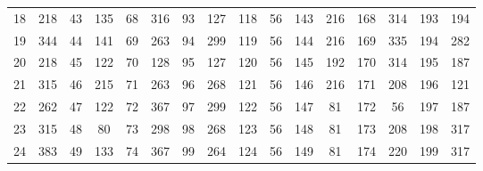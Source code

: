\begin{tabular}{|c|c|c|c|c|c|c|c|c|c|c|c|c|c|c|c|}
    18 & 218 & 43 & 135 & 68 & 316 & 93 & 127 & 118 & 56 & 143 & 216 & 168 & 314 & 193 & 194\\
    19 & 344 & 44 & 141 & 69 & 263 & 94 & 299 & 119 & 56 & 144 & 216 & 169 & 335 & 194 & 282\\
    20 & 218 & 45 & 122 & 70 & 128 & 95 & 127 & 120 & 56 & 145 & 192 & 170 & 314 & 195 & 187\\
    21 & 315 & 46 & 215 & 71 & 263 & 96 & 268 & 121 & 56 & 146 & 216 & 171 & 208 & 196 & 121\\
    22 & 262 & 47 & 122 & 72 & 367 & 97 & 299 & 122 & 56 & 147 & 81 & 172 & 56 & 197 & 187\\
    23 & 315 & 48 & 80 & 73 & 298 & 98 & 268 & 123 & 56 & 148 & 81 & 173 & 208 & 198 & 317\\
    24 & 383 & 49 & 133 & 74 & 367 & 99 & 264 & 124 & 56 & 149 & 81 & 174 & 220 & 199 & 317\\
    \hline
\end{tabular}
